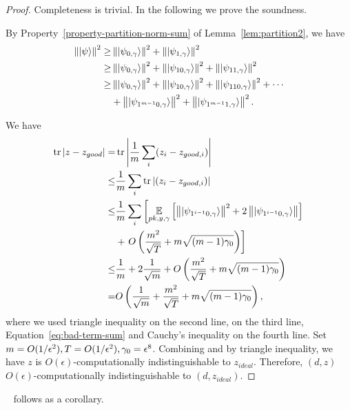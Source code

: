 \begin{proof}
	Completeness is trivial. In the following we prove the soundness.
	
	By Property~\ref{property-partition-norm-sum} of Lemma~\ref{lem:partition2}, we have
	\begin{align} \label{eq:bad-term-sum}
		\left\lVert\ket{\psi}\right\rVert^2 \geq& \left\lVert\ket{\psi_{0,\gamma}}\right\rVert^2+\left\lVert\ket{\psi_{1,\gamma}}\right\rVert^2 \nonumber \\
		\geq& \left\lVert\ket{\psi_{0,\gamma}}\right\rVert^2+
		\left\lVert\ket{\psi_{10,\gamma}}\right\rVert^2+ \left\lVert\ket{\psi_{11,\gamma}}\right\rVert^2 \nonumber \\
		\geq& \left\lVert\ket{\psi_{0,\gamma}}\right\rVert^2+
		\left\lVert\ket{\psi_{10,\gamma}}\right\rVert^2+ \left\lVert\ket{\psi_{110,\gamma}}\right\rVert^2 +\cdots  \nonumber \\
		&+ \left\lVert\ket{\psi_{1^{m-1}0,\gamma}}\right\rVert^2+ \left\lVert\ket{\psi_{1^{m-1}1,\gamma}}\right\rVert^2.
	\end{align}

	We have
	\begin{align} \label{eq:z-z-good}
		\tr|z-z_{good}| =& \tr\L|\frac{1}{m}\sum_i (z_i-z_{good,i})\R| \nn \\
		\leq&  \frac{1}{m}\sum_i\tr| (z_i-z_{good,i})| \nn \\
		\leq&  \frac{1}{m}\sum_i\L[\E_{pk, y, \gamma}\L[\norm{\ket{\psi_{1^{i-1}0,\gamma}}}^2+ 2\norm{\ket{\psi_{1^{i-1}0,\gamma}}}\R] \R.\nn \\
		&+ \L. O\L(\frac{m^2}{\sqrt T}+m\sqrt{(m-1)\gamma_0}\R)\R] \nn \\%
		\leq&  \frac{1}{m}+ 2\frac{1}{\sqrt m}+O\L(\frac{m^2}{\sqrt T}+m\sqrt{(m-1)\gamma_0}\R) \nn \\ %
		=&O\L( \frac{1}{\sqrt m}+\frac{m^2}{\sqrt T}+m\sqrt{(m-1)\gamma_0}\R),  
	\end{align}
	where we used triangle inequality on the second line,  on the third line, Equation~\ref{eq:bad-term-sum} and Cauchy's inequality on the fourth line.
	Set $m=O(1/\epsilon^2), T=O(1/\epsilon^2),\gamma_0=\epsilon^8$. Combining  and  by triangle inequality, we have $z$ is $O(\epsilon)$-computationally indistinguishable to $z_{ideal}$. Therefore, $(d,z)$  $O(\epsilon)$-computationally indistinguishable to $(d,z_{ideal})$.
\end{proof}

~ follows as a corollary.


